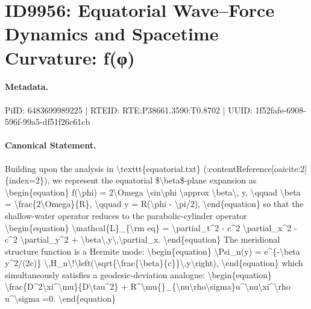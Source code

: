 \section*{ID9956: Equatorial Wave–Force Dynamics and Spacetime Curvature: f(φ)}
\paragraph{Metadata.}
PiID: 6483699989225 | RTEID: RTE:P38661.3590:T0.8702 | UUID: 1f52fafe-6908-596f-99a5-df51f26c61cb

\paragraph{Canonical Statement.}
Building upon the analysis in \textbackslash{}texttt\{equatorial.txt\} (:contentReference[oaicite:2]\{index=2\}), we represent the equatorial \$\textbackslash{}beta\$-plane expansion as \textbackslash{}begin\{equation\} f(\textbackslash{}phi) = 2\textbackslash{}Omega \textbackslash{}sin\textbackslash{}phi \textbackslash{}approx \textbackslash{}beta\textbackslash{}, y, \textbackslash{}qquad \textbackslash{}beta = \textbackslash{}frac\{2\textbackslash{}Omega\}\{R\}, \textbackslash{}qquad y = R(\textbackslash{}phi - \textbackslash{}pi/2), \textbackslash{}end\{equation\} so that the shallow-water operator reduces to the parabolic-cylinder operator \textbackslash{}begin\{equation\} \textbackslash{}mathcal\{L\}\_\{\textbackslash{}rm eq\} = \textbackslash{}partial\_t\textasciicircum{}2 - c\textasciicircum{}2 \textbackslash{}partial\_x\textasciicircum{}2 - c\textasciicircum{}2 \textbackslash{}partial\_y\textasciicircum{}2 + \textbackslash{}beta\textbackslash{},y\textbackslash{},\textbackslash{}partial\_x. \textbackslash{}end\{equation\} The meridional structure function is a Hermite mode: \textbackslash{}begin\{equation\} \textbackslash{}Psi\_n(y) = e\textasciicircum{}\{-\textbackslash{}beta y\textasciicircum{}2/(2c)\} \textbackslash{},H\_n\textbackslash{}!\textbackslash{}left(\textbackslash{}sqrt\{\textbackslash{}frac\{\textbackslash{}beta\}\{c\}\}\textbackslash{},y\textbackslash{}right), \textbackslash{}end\{equation\} which simultaneously satisfies a geodesic-deviation analogue: \textbackslash{}begin\{equation\} \textbackslash{}frac\{D\textasciicircum{}2\textbackslash{}xi\textasciicircum{}\textbackslash{}mu\}\{D\textbackslash{}tau\textasciicircum{}2\} + R\textasciicircum{}\textbackslash{}mu\{\}\_\{\textbackslash{}nu\textbackslash{}rho\textbackslash{}sigma\}u\textasciicircum{}\textbackslash{}nu\textbackslash{}xi\textasciicircum{}\textbackslash{}rho u\textasciicircum{}\textbackslash{}sigma =0. \textbackslash{}end\{equation\}

